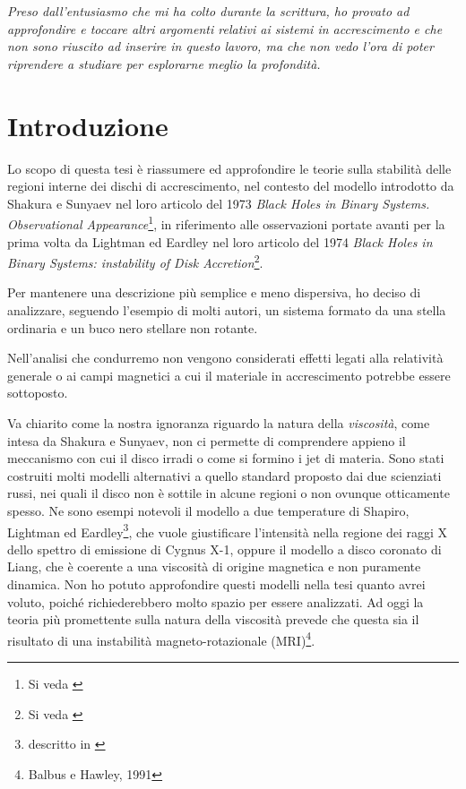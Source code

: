 \documentclass[a4paperbi]{article}
\begin{document}
\textit{Preso dall'entusiasmo che mi ha colto durante la scrittura, ho provato ad approfondire e toccare altri argomenti relativi ai sistemi in accrescimento e che non sono riuscito ad inserire in questo lavoro, ma che non vedo l'ora di poter riprendere a studiare per esplorarne meglio la profondità.}
\vspace*{\fill}

\newpage
\vspace*{\fill}
\tableofcontents
\vspace*{\fill}

\newpage
\section{Introduzione}
	Lo scopo di questa tesi è riassumere ed approfondire le teorie sulla stabilità delle regioni interne dei dischi di accrescimento, nel contesto del modello introdotto da Shakura e Sunyaev nel loro articolo del 1973 \textit{Black Holes in Binary Systems. Observational Appearance}\footnote{Si veda \cite{ShakuraSunyaev1973}}, in riferimento alle osservazioni portate avanti per la prima volta da Lightman ed Eardley nel loro articolo del 1974 \textit{Black Holes in Binary Systems: instability of Disk Accretion}\footnote{Si veda \cite{LightmanEardley1974}}.

	Per mantenere una descrizione più semplice e meno dispersiva, ho deciso di analizzare, seguendo l'esempio di molti autori, un sistema formato da una stella ordinaria e un buco nero stellare non rotante. 
	
	Nell'analisi che condurremo non vengono considerati effetti legati alla relatività generale o ai campi magnetici a cui il materiale in accrescimento potrebbe essere sottoposto.

	Va chiarito come la nostra ignoranza riguardo la natura della \textit{viscosità}, come intesa da Shakura e Sunyaev, non ci permette di comprendere appieno il meccanismo con cui il disco irradi o come si formino i jet di materia. Sono stati costruiti molti modelli alternativi a quello standard proposto dai due scienziati russi, nei quali il disco non è sottile in alcune regioni o non ovunque otticamente spesso. Ne sono esempi notevoli il modello a due temperature di Shapiro, Lightman ed Eardley\footnote{descritto in \cite{ShapiroLightmanEardley1976}}, che vuole giustificare l'intensità nella regione dei raggi X dello spettro di emissione di Cygnus X-1, oppure il modello a disco coronato di Liang, che è coerente a una viscosità di origine magnetica e non puramente dinamica. Non ho potuto approfondire questi modelli nella tesi quanto avrei voluto, poiché richiederebbero molto spazio per essere analizzati. Ad oggi la teoria più promettente sulla natura della viscosità prevede che questa sia il risultato di una instabilità magneto-rotazionale (MRI)\footnote{Balbus e Hawley, 1991}.
\end{document}

